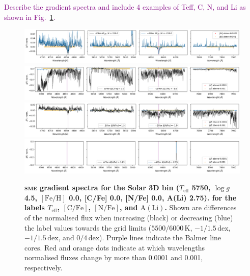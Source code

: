 \documentclass[
  journal=pasa,
  manuscript=research-paper, %
  year=2021,
  volume=37
]{cup-journal}
\newcommand{\SB}[1]{{\textcolor{purple}{#1}}}
\newcommand{\Teff}{$T_\mathrm{eff}$\xspace}
\newcommand{\logg}{$\log g$\xspace}
\newcommand{\feh}{$\mathrm{[Fe/H]}$\xspace}
\newcommand{\vmic}{$v_\mathrm{mic}$\xspace}
\newcommand{\sme}{\textsc{sme}\xspace}
\newcommand{\dex}{\,\mathrm{dex}}	%
\newcommand{\K}{\,\mathrm{K}}	%
\begin{document}
\SB{Describe the gradient spectra and include 4 examples of Teff, C, N, and Li as shown in Fig.~\ref{fig:gradient_spectrum_5750_4.50_0.00}.}


\begin{figure}[!ht]
 \centering
 \includegraphics[width=\textwidth]{figures/gradient_spectrum_5750_4.50_0.00_teff.png}
 \includegraphics[width=\textwidth]{figures/gradient_spectrum_5750_4.50_0.00_c_fe.png}
 \includegraphics[width=\textwidth]{figures/gradient_spectrum_5750_4.50_0.00_n_fe.png}
 \includegraphics[width=\textwidth]{figures/gradient_spectrum_5750_4.50_0.00_li_fe.png} \caption{\textbf{\sme gradient spectra for the Solar 3D bin (\Teff 5750, \logg 4.5, \feh 0.0, [C/Fe] 0.0, [N/Fe] 0.0, A(Li) 2.75). for the labels \Teff, $\mathrm{[C/Fe]}$, $\mathrm{[N/Fe]}$, and $\mathrm{A(Li)}$.} Shown are differences of the normalised flux when increasing (black) or decreasing (blue) the label values towards the grid limits ($5500/6000\K$, $-1/1.5\dex$, $-1/1.5\dex$, and $0/4\dex$). Purple lines indicate the Balmer line cores. Red and orange dots indicate at which wavelengths normalised fluxes change by more than 0.0001 and 0.001, respectively.
} \label{fig:gradient_spectrum_5750_4.50_0.00}
\end{figure}
\end{document}
